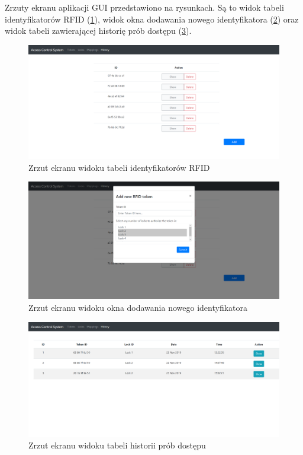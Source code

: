 		Zrzuty ekranu aplikacji GUI przedstawiono na rysunkach. Są to widok tabeli identyfikatorów RFID (\ref{fig:ss1}), widok okna dodawania nowego identyfikatora (\ref{fig:ss2}) oraz widok tabeli zawierającej historię prób dostępu (\ref{fig:ss3}).

		\begin{figure}[]
            \centering
            \includegraphics[width=\textwidth, frame]{chapters/images/ss1.png}
            \caption{Zrzut ekranu widoku tabeli identyfikatorów RFID}
            \label{fig:ss1}
        \end{figure}

        \begin{figure}[]
            \centering
            \includegraphics[width=\textwidth]{chapters/images/ss2.png}
            \caption{Zrzut ekranu widoku okna dodawania nowego identyfikatora}
            \label{fig:ss2}
        \end{figure}

        \begin{figure}[]
            \centering
            \includegraphics[width=\textwidth, frame]{chapters/images/ss3.png}
            \caption{Zrzut ekranu widoku tabeli historii prób dostępu}
            \label{fig:ss3}
        \end{figure}

